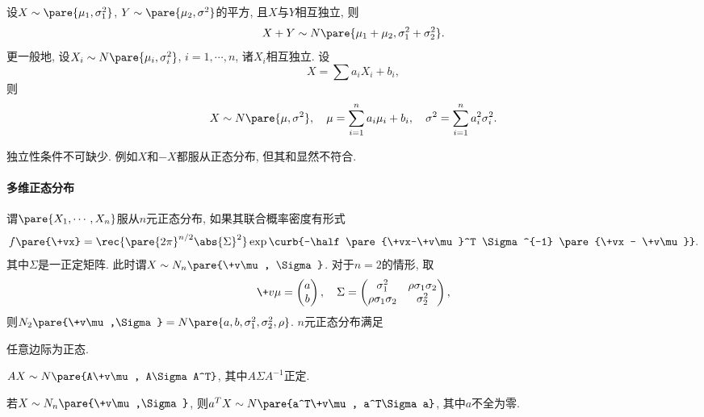 \documentclass[../Statistics.tex]{subfiles}
\begin{document}
\begin{sample}
    \begin{ex}
        设$X\sim\pare{\mu_1,\sigma_1^2}$, $Y\sim\pare{\mu_2,\sigma^2}$的平方, 且$X$与$Y$相互独立, 则
        \[ X+Y \sim N\pare{\mu_1+\mu_2, \sigma_1^2 + \sigma_2^2}. \]
        更一般地, 设$X_i\sim N\pare{\mu_i,\sigma_i^2}$, $i=1,\cdots,n$, 诸$X_i$相互独立. 设
        \[ X = \sum a_iX_i + b_i, \]
        则
        \[ X \sim N\pare{\mu,\sigma^2},\quad \mu = \sum_{i=1}^n a_i\mu_i + b_i,\quad \sigma^2 = \sum_{i=1}^n a_i^2 \sigma_i^2. \]
    \end{ex}
    \begin{remark}
        独立性条件不可缺少. 例如$X$和$-X$都服从正态分布, 但其和显然不符合.
    \end{remark}
\end{sample}

\paragraph{多维正态分布} %
\label{par:多维正态分布}

谓$\pare{X_1,\cdots,X_n}$服从$n$元正态分布, 如果其联合概率密度有形式
\[ f\pare{\+vx} = \rec{\pare{2\pi}^{n/2}\abs{\Sigma}^2}\exp\curb{-\half\pare{\+vx-\+v\mu}^T \Sigma^{-1} \pare{\+vx - \+v\mu}}. \]
其中$\Sigma$是一正定矩阵. 此时谓$X\sim N_n\pare{\+v\mu, \Sigma}$. 对于$n=2$的情形, 取
\[ \+v\mu = \begin{pmatrix}
    a\\
    b
\end{pmatrix},\quad \Sigma = \begin{pmatrix}
    \sigma_1^2 & \rho\sigma_1\sigma_2 \\
    \rho\sigma_1\sigma_2 & \sigma_2^2
\end{pmatrix}, \]
则$N_2\pare{\+v\mu,\Sigma} = N\pare{a,b,\sigma_1^2,\sigma_2^2,\rho}$. $n$元正态分布满足
\begin{cenum}
    \item 任意边际为正态.
    \item $AX \sim N\pare{A\+v\mu, A\Sigma A^T}$, 其中$A\Sigma A^{-1}$正定.
    \item 若$X\sim N_n\pare{\+v\mu,\Sigma}$, 则$a^T X\sim N\pare{a^T\+v\mu, a^T\Sigma a}$, 其中$a$不全为零.
\end{cenum}

\end{document}
